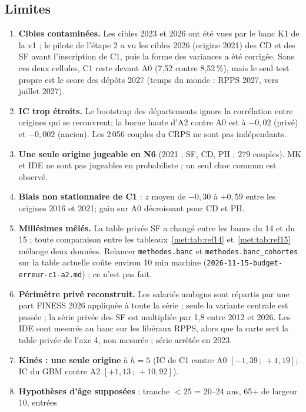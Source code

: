 \subsection{Limites}
\label{met:limites}
\begin{enumerate}
  \item \textbf{Cibles contaminées.} Les cibles 2023 et 2026 ont été vues par le banc K1 de la v1 ; le pilote
    de l'étape 2 a vu les cibles 2026 (origine 2021) des CD et des SF avant l'inscription de C1, puis la
    forme des variances a été corrigée. Sans ces deux cellules, C1 reste devant A0 (7,52 contre
    8,52\,\%\mesure), mais le seul test propre est le score des dépôts 2027 (temps du monde : RPPS 2027,
    vers juillet 2027\suppose).
  \item \textbf{IC trop étroits.} Le bootstrap des départements ignore la corrélation entre origines qui se
    recouvrent\suppose ; la borne haute d'A2 contre A0 est à $-0{,}02$ (privé) et $-0{,}002$
    (ancien)\mesure. Les 2\,056 couples du CRPS ne sont pas indépendants.
  \item \textbf{Une seule origine jugeable en N6} (2021 ; SF, CD, PH ; 279 couples). MK et IDE ne sont pas
    jugeables en probabiliste ; un seul choc commun est observé.
  \item \textbf{Biais non stationnaire de C1} : $z$ moyen de $-0{,}30$ à $+0{,}59$ entre les origines 2016 et
    2021\mesure ; gain sur A0 décroissant pour CD et PH.
  \item \textbf{Millésimes mêlés.} La table privée SF a changé entre les bancs du 14 et du 15 ; toute
    comparaison entre les tableaux~\ref{met:tab:ref14} et~\ref{met:tab:ref15} mélange deux données. Relancer
    \texttt{methodes.banc} et \texttt{methodes.banc\_cohortes} sur la table actuelle coûte environ
    10\suppose{} min machine (\texttt{2026-11-15-budget-erreur-c1-a2.md}) ; ce n'est pas fait.
  \item \textbf{Périmètre privé reconstruit.} Les salariés ambigus sont répartis par une part FINESS 2026
    appliquée à toute la série ; seule la variante centrale est passée ; la série privée des SF est
    multipliée par 1,8\mesure{} entre 2012 et 2026. Les IDE sont mesurés au banc sur les libéraux RPPS, alors
    que la carte sert la table privée de l'axe 4, non mesurée ; série arrêtée en 2023.
  \item \textbf{Kinés : une seule origine} à $h = 5$ (IC de C1 contre A0 $[-1{,}39\,;\,+1{,}19]$\mesure ; IC
    du GBM contre A2 $[+1{,}13\,;\,+10{,}92]$\mesure).
  \item \textbf{Hypothèses d'âge supposées} : tranche $<25$ = 20--24 ans, 65+ de largeur 10, entrées

\end{enumerate}
